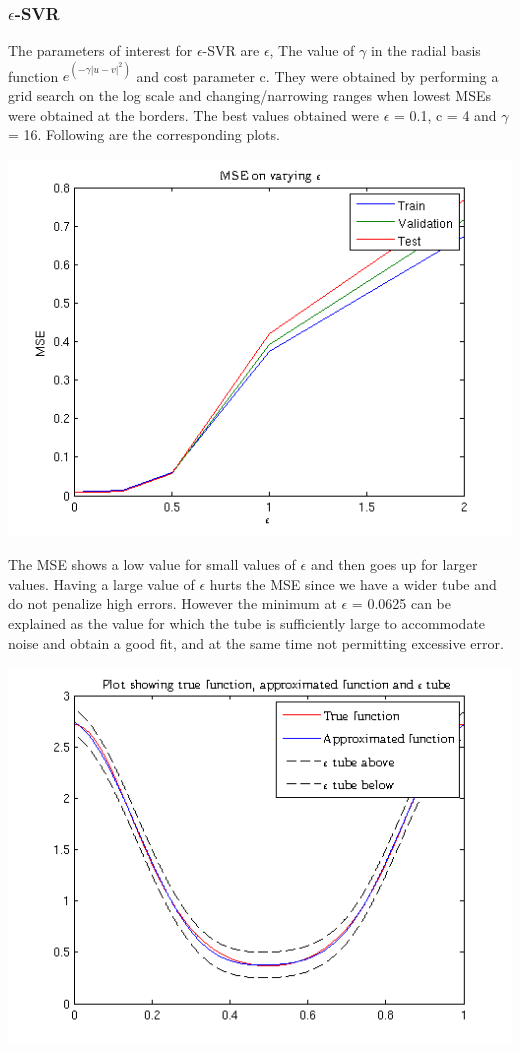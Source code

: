 \documentclass{article}
\begin{document}
\subsubsection{$\epsilon$-SVR}
The parameters of interest for $\epsilon$-SVR are $\epsilon$, The value of $\gamma$ in the radial basis function $e^{(-\gamma|u-v|^2)}$ and cost parameter c. They were obtained by performing a grid search on the log scale and changing/narrowing ranges when lowest MSEs were obtained at the borders.
The best values obtained were $\epsilon$ = 0.1, c = 4 and $\gamma$ = 16. Following are the corresponding plots.
\begin{center}
\includegraphics[scale=0.6]{Regression/mse}
\end{center}
The MSE shows a low value for small values of $\epsilon$ and then goes up for larger values. Having a large value of $\epsilon$ hurts the MSE since we have a wider tube and do not penalize high errors. However the minimum at $\epsilon$ = 0.0625 can be explained as the value for which the tube is sufficiently large to accommodate noise and obtain a good fit, and at the same time not permitting excessive error.
\begin{center}
\includegraphics[scale=0.7]{Regression/plot_1}
\end{center}
\end{document}
